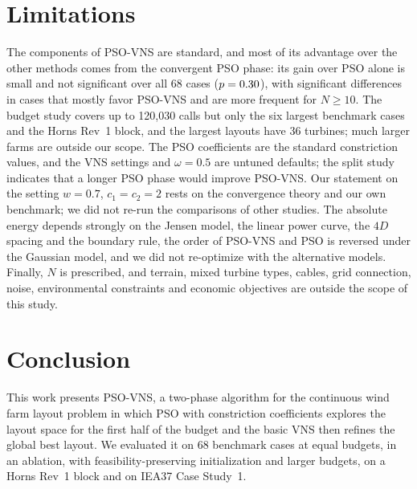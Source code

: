 \documentclass[journal,twoside]{IEEEtran}
\begin{document}
\section{Limitations}
\label{sec:limits}
The components of PSO-VNS are standard, and most of its advantage over the other methods comes from the convergent PSO phase: its gain over PSO alone is small and not significant over all 68 cases ($p=0.30$), with significant differences in \NWtlPSOSig{} cases that mostly favor PSO-VNS and are more frequent for $N\ge10$. The budget study covers up to 120,030 calls but only the six largest benchmark cases and the Horns Rev~1 block, and the largest layouts have 36 turbines; much larger farms are outside our scope. The PSO coefficients are the standard constriction values, and the VNS settings and $\omega=0.5$ are untuned defaults; the split study indicates that a longer PSO phase would improve PSO-VNS. Our statement on the setting $w=0.7$, $c_1=c_2=2$ rests on the convergence theory and our own benchmark; we did not re-run the comparisons of other studies. The absolute energy depends strongly on the Jensen model, the linear power curve, the $4D$ spacing and the boundary rule, the order of PSO-VNS and PSO is reversed under the Gaussian model, and we did not re-optimize with the alternative models. Finally, $N$ is prescribed, and terrain, mixed turbine types, cables, grid connection, noise, environmental constraints and economic objectives are outside the scope of this study.

\section{Conclusion}
\label{sec:conclusion}
This work presents PSO-VNS, a two-phase algorithm for the continuous wind farm layout problem in which PSO with constriction coefficients explores the layout space for the first half of the budget and the basic VNS then refines the global best layout. We evaluated it on 68 benchmark cases at equal budgets, in an ablation, with feasibility-preserving initialization and larger budgets, on a Horns Rev~1 block and on IEA37 Case Study~1.
\end{document}
